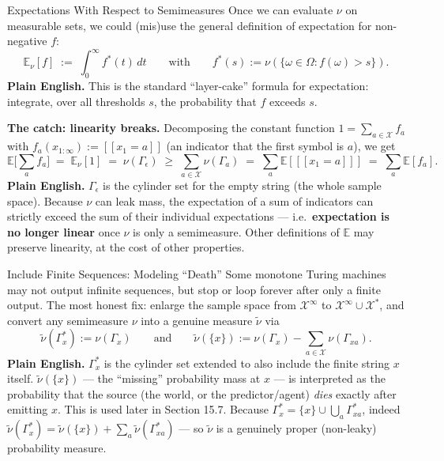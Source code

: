\documentclass[aspectratio=169,10pt]{beamer}
\newcommand{\E}{\mathbb{E}}
\begin{document}
\begin{frame}{Expectations With Respect to Semimeasures}
  Once we can evaluate $\nu$ on measurable sets, we could (mis)use the
  general definition of expectation for non-negative $f$:
  \[
    \E_\nu[f] \;:=\; \int_0^\infty f^*(t)\,dt \qquad \text{with} \qquad
    f^*(s) := \nu(\{\omega\in\Omega : f(\omega) > s\}).
  \]
  \textbf{Plain English.} This is the standard ``layer-cake'' formula for
  expectation: integrate, over all thresholds $s$, the probability that $f$
  exceeds $s$.

  \textbf{The catch: linearity breaks.} Decomposing the constant function
  $1 = \sum_{a\in\mathcal{X}} f_a$ with $f_a(x_{1:\infty}) := [\![x_1=a]\!]$
  (an indicator that the first symbol is $a$), we get
  \[
    \E\Big[\sum_a f_a\Big] \;=\; \E_\nu[1] \;=\; \nu(\Gamma_\epsilon)
    \;\ge\; \sum_{a\in\mathcal{X}} \nu(\Gamma_a) \;=\; \sum_a \E[[\![x_1=a]\!]]
    \;=\; \sum_a \E[f_a].
  \]
  \textbf{Plain English.} $\Gamma_\epsilon$ is the cylinder set for the empty
  string (the whole sample space). Because $\nu$ can leak mass, the
  expectation of a sum of indicators can strictly exceed the sum of their
  individual expectations --- i.e.\ \textbf{expectation is no longer
  linear} once $\nu$ is only a semimeasure. Other definitions of $\E$ may
  preserve linearity, at the cost of other properties.
\end{frame}

\begin{frame}{Include Finite Sequences: Modeling ``Death''}
  Some monotone Turing machines may not output infinite sequences, but stop
  or loop forever after only a finite output. The most honest fix: enlarge
  the sample space from $\mathcal{X}^\infty$ to $\mathcal{X}^\infty \cup
  \mathcal{X}^*$, and convert any semimeasure $\nu$ into a genuine measure
  $\tilde\nu$ via
  \[
    \tilde\nu(\Gamma_x^*) := \nu(\Gamma_x) \qquad \text{and} \qquad
    \tilde\nu(\{x\}) := \nu(\Gamma_x) - \sum_{a\in\mathcal{X}} \nu(\Gamma_{xa}).
  \]
  \textbf{Plain English.} $\Gamma_x^*$ is the cylinder set extended to also
  include the finite string $x$ itself. $\tilde\nu(\{x\})$ --- the
  ``missing'' probability mass at $x$ --- is interpreted as the probability
  that the source (the world, or the predictor/agent) \emph{dies} exactly
  after emitting $x$. This is used later in Section 15.7. Because
  $\Gamma_x^* = \{x\} \cup \bigcup_a \Gamma_{xa}^*$, indeed
  $\tilde\nu(\Gamma_x^*) = \tilde\nu(\{x\}) + \sum_a \tilde\nu(\Gamma_{xa}^*)$
  --- so $\tilde\nu$ is a genuinely proper (non-leaky) probability measure.
\end{frame}
\end{document}
